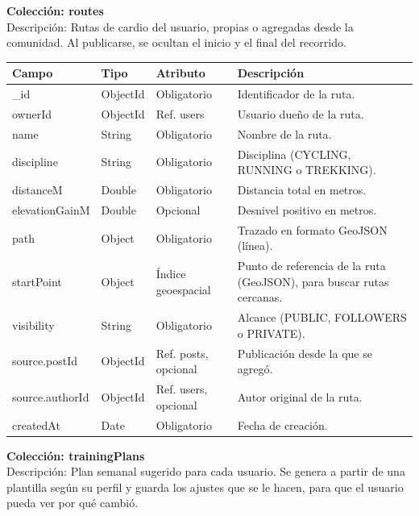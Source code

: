 \newpage
\noindent\textbf{Colección: routes} \\
Descripción: Rutas de cardio del usuario, propias o agregadas desde la comunidad. Al publicarse, se ocultan el inicio y el final del recorrido.
{\footnotesize
\renewcommand{\arraystretch}{1.2}
\begin{longtable}{|>{\raggedright\arraybackslash}p{4.7cm}|>{\raggedright\arraybackslash}p{1.8cm}|>{\raggedright\arraybackslash}p{2.3cm}|>{\raggedright\arraybackslash}p{5.4cm}|}
    \hline
    \rowcolor[HTML]{EFEFEF}
    \textbf{Campo} & \textbf{Tipo} & \textbf{Atributo} & \textbf{Descripción} \\ \hline
    \endhead
    \_id & ObjectId & Obligatorio & Identificador de la ruta. \\ \hline
    ownerId & ObjectId & Ref. users & Usuario dueño de la ruta. \\ \hline
    name & String & Obligatorio & Nombre de la ruta. \\ \hline
    discipline & String & Obligatorio & Disciplina (CYCLING, RUNNING o TREKKING). \\ \hline
    distanceM & Double & Obligatorio & Distancia total en metros. \\ \hline
    elevationGainM & Double & Opcional & Desnivel positivo en metros. \\ \hline
    path & Object & Obligatorio & Trazado en formato GeoJSON (línea). \\ \hline
    startPoint & Object & Índice geoespacial & Punto de referencia de la ruta (GeoJSON), para buscar rutas cercanas. \\ \hline
    visibility & String & Obligatorio & Alcance (PUBLIC, FOLLOWERS o PRIVATE). \\ \hline
    source.\allowbreak postId & ObjectId & Ref. posts, opcional & Publicación desde la que se agregó. \\ \hline
    source.\allowbreak authorId & ObjectId & Ref. users, opcional & Autor original de la ruta. \\ \hline
    createdAt & Date & Obligatorio & Fecha de creación. \\ \hline
\end{longtable}
}
\newpage
\noindent\textbf{Colección: trainingPlans} \\
Descripción: Plan semanal sugerido para cada usuario. Se genera a partir de una plantilla según su perfil y guarda los ajustes que se le hacen, para que el usuario pueda ver por qué cambió.
